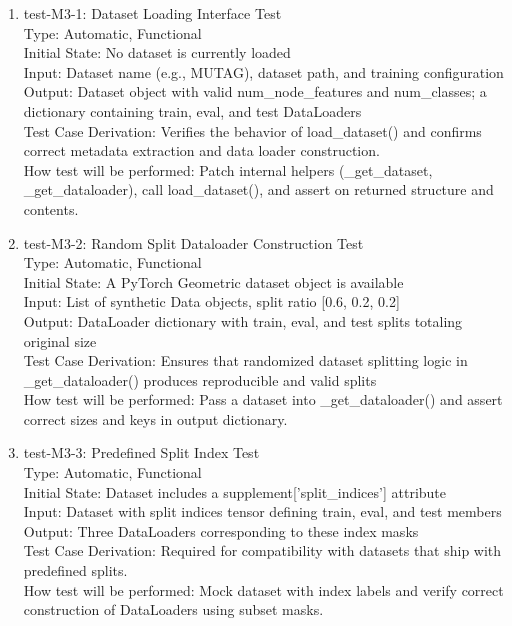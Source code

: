 \documentclass[12pt, titlepage]{article}
\begin{document}
\begin{enumerate}

\item{test-M3-1: Dataset Loading Interface Test\\}
Type: Automatic, Functional \\
Initial State: No dataset is currently loaded \\
Input: Dataset name (e.g., MUTAG), dataset path, and training configuration \\
Output: Dataset object with valid num\_node\_features and num\_classes; a dictionary containing train, eval, and test DataLoaders \\
Test Case Derivation: Verifies the behavior of load\_dataset() and confirms correct metadata extraction and data loader construction. \\
How test will be performed: Patch internal helpers (\_get\_dataset, \_get\_dataloader), call load\_dataset(), and assert on returned structure and contents.

\item{test-M3-2: Random Split Dataloader Construction Test\\}
Type: Automatic, Functional \\
Initial State: A PyTorch Geometric dataset object is available \\
Input: List of synthetic Data objects, split ratio [0.6, 0.2, 0.2] \\
Output: DataLoader dictionary with train, eval, and test splits totaling original size \\
Test Case Derivation: Ensures that randomized dataset splitting logic in \_get\_dataloader() produces reproducible and valid splits \\
How test will be performed: Pass a dataset into \_get\_dataloader() and assert correct sizes and keys in output dictionary.

\item{test-M3-3: Predefined Split Index Test\\}
Type: Automatic, Functional \\
Initial State: Dataset includes a supplement['split\_indices'] attribute \\
Input: Dataset with split indices tensor defining train, eval, and test members \\
Output: Three DataLoaders corresponding to these index masks \\
Test Case Derivation: Required for compatibility with datasets that ship with predefined splits. \\
How test will be performed: Mock dataset with index labels and verify correct construction of DataLoaders using subset masks.


\end{enumerate}
\end{document}
